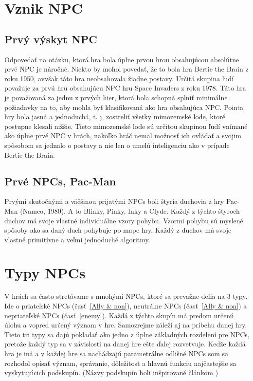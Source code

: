 \documentclass[10pt,twoside,slovak,a4paper]{article}
\begin{document}
\section{Vznik NPC}    \label{Vznik}
\subsection{Prvý výskyt NPC} \label{NPC 1 time}
Odpovedať na otázku, ktorá hra bola úplne prvou hrou obsahujúcou absolútne prvé NPC je náročné. Niekto by mohol povedať, že to bola hra Bertie the Brain z roku 1950, avvšak táto hra neobsahovala žiadne postavy. Určitá skupina ľudí považuje za prvú hru obsahujúcu NPC hru Space Invaders z roku 1978. \cite{10.1007/978-3-319-40259-8_7} Táto hra je považovaná za jednu z prvých hier, ktorá bola schopná splniť minimálne požiadavky na to, aby mohla byť klasifikovaná ako hra obsahujúca NPC. Pointa hry bola jasná a jednoduchá, t. j. zostreliť všetky mimozemské lode, ktoré postupne klesali nižšie. Tieto mimozemské lode sú určitou skupinou ľudí vnímané ako úplne prvé NPC v hrách, nakoľko hráč nemal možnosť ich ovládať a svojim spôsobom sa jednalo o postavy a nie len o umelú inteligenciu ako v prípade Bertie the Brain. 


\subsection{Prvé NPCs, Pac-Man}
Prvými skutočnými a väčšinou prijatými NPCs boli štyria duchovia z hry Pac-Man (Namco, 1980). A to Blinky, Pinky, Inky a Clyde. Každý z týchto štyroch duchov má svoje vlastné individuálne vzory pohybu. \cite{Hack2018} Vzormi pohybu sú myslené spôsoby ako sa daný duch pohybuje po mape hry. Každý z duchov má svoje vlastné primitívne a veľmi jednoduché algoritmy.
 



\section{Typy NPCs}     \label{Typy}
V hrách sa často stretávame s mnohými NPCs, ktoré sa prevažne delia na 3 typy. Ide o priateľské NPCs (časť~\ref{Ally & non}), neutrálne NPCs (časť~\ref{Ally & non}) a nepriateľské NPCs (časť~\ref{enemy}). Každá z týchto skupín má predom určenú úlohu a vopred určený význam v hre. Samozrejme záleží aj na príbehu danej hry. Tieto tri typy sa dajú pokladať ako jedno z úplne základných rozdelení pre NPCs, pretože každý typ sa v závislosti na danej hre ešte ďalej rozvetvuje. Keďže každá hra je iná a v každej hre sa nachádzajú parametrálne odlišné NPCs som sa rozhodol opísať význam, správanie, dôležitosť a hlavnú funkciu najčastejšie sa vyskytujúcich podskupín. (Názvy podskupín boli inšpirované článkom \cite{phdthesis})
\end{document}
